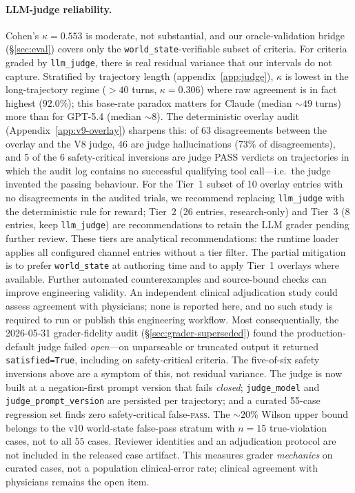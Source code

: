 \paragraph{LLM-judge reliability.}
Cohen's $\kappa = 0.553$ is moderate, not substantial, and our
oracle-validation bridge (\S\ref{sec:eval}) covers only the
\texttt{world\_state}-verifiable subset of criteria. For criteria
graded by \texttt{llm\_judge}, there is real residual variance that
our intervals do not capture. Stratified by trajectory length
(appendix~\ref{app:judge}), $\kappa$ is lowest in the long-trajectory
regime ($>40$ turns, $\kappa=0.306$) where raw agreement is in fact
highest ($92.0\%$); this base-rate paradox matters for Claude
(median $\sim 49$ turns) more than for GPT-5.4 (median $\sim 8$). The
deterministic overlay audit (Appendix~\ref{app:v9-overlay}) sharpens
this: of 63 disagreements between the overlay and the V8 judge,
46 are judge hallucinations  %
(73\% of disagreements), and 5 of the 6 safety-critical
inversions  %
are judge PASS verdicts on trajectories in which the audit log
contains no successful qualifying tool call---i.e.\ the judge
invented the passing behaviour. For the Tier~1 subset of 10 overlay
entries with no disagreements in the audited trials,  %
we recommend replacing \texttt{llm\_judge} with
the deterministic rule for reward; Tier~2 (26 entries,  %
research-only) and Tier~3 (8 entries,  %
keep \texttt{llm\_judge}) are recommendations to retain the LLM grader
pending further review. These tiers are analytical recommendations:
the runtime loader applies all configured channel entries without a
tier filter. The partial mitigation
is to prefer \texttt{world\_state} at authoring time and to apply
Tier~1 overlays where available. Further automated counterexamples and
source-bound checks can improve engineering validity. An independent clinical
adjudication study could assess agreement with physicians; none is reported
here, and no such study is required to run or publish this engineering workflow.
Most consequentially, the 2026-05-31 grader-fidelity audit
(\S\ref{sec:grader-superseded}) found the production-default judge failed
\emph{open}---on unparseable or truncated output it returned
\texttt{satisfied=True}, including on safety-critical criteria. The
five-of-six safety inversions above are a symptom of this, not residual
variance. The judge is now built at a negation-first prompt version that
fails \emph{closed}; \texttt{judge\_model} and \texttt{judge\_prompt\_version}
are persisted per trajectory; and a curated 55-case regression set finds
zero safety-critical false-\textsc{pass}. The $\sim 20\%$ Wilson upper bound
belongs to the v10 world-state false-pass stratum with $n=15$ true-violation
cases, not to all $55$ cases. Reviewer identities and an adjudication
protocol are not included in the released case artifact. This measures
grader \emph{mechanics} on curated cases, not a population clinical-error
rate; clinical agreement with physicians remains the open item.

